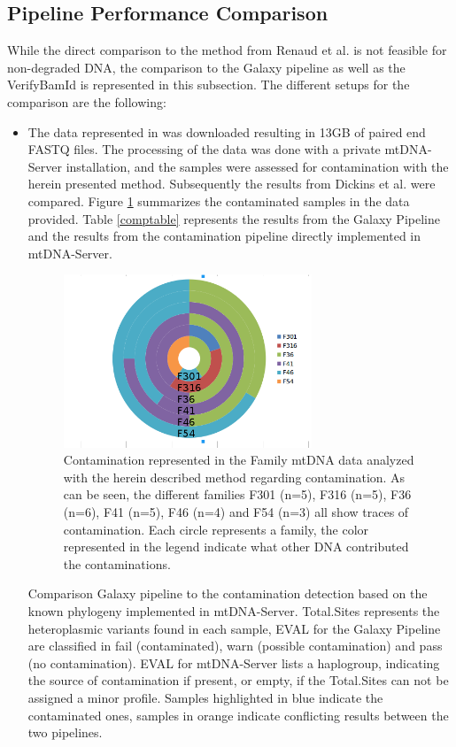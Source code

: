 \subsection{Pipeline Performance Comparison}
While the direct comparison to the method from Renaud et al. \cite{Renaud2015} is not feasible for non-degraded DNA, the comparison to the Galaxy pipeline \cite{Dickins2014} as well as the VerifyBamId \cite{Flickinger2015} is represented in this subsection. The different setups for the comparison are the following: 
\begin{itemize}
\item The data represented in \cite{Dickins2014} was downloaded resulting in 13GB of paired end FASTQ files. The processing of the data was done with a private mtDNA-Server installation, and the samples were assessed for contamination with the herein presented method. Subsequently the results from Dickins et al. were compared. Figure \ref{cont:family} summarizes the contaminated samples in the data provided. Table \ref{comptable} represents the results from the Galaxy Pipeline and the results from the contamination pipeline directly implemented in mtDNA-Server.
\begin{figure}[!ht]
    \centering
    \includegraphics[width=0.7\textwidth]{images/families.png}
    \caption[Contamination represented in the Family mtDNA data]{Contamination represented in the Family mtDNA data  \cite{Dickins2014} analyzed with the herein described method regarding contamination. As can be seen, the different families F301 (n=5), F316 (n=5), F36 (n=6), F41 (n=5), F46 (n=4) and F54 (n=3) all show traces of contamination. Each circle represents a family, the color represented in the legend indicate what other DNA contributed the contaminations.} 
    \label{cont:family}
\end{figure}
\begin{table}[]
\centering
\caption{Comparison Galaxy pipeline to the contamination detection based on the known phylogeny implemented in mtDNA-Server. Total.Sites represents the heteroplasmic variants found in each sample, EVAL for the Galaxy Pipeline are classified in fail (contaminated), warn (possible contamination) and pass (no contamination). EVAL for mtDNA-Server lists a haplogroup, indicating the source of contamination if present, or empty, if the Total.Sites can not be assigned a minor profile. Samples highlighted in blue indicate the contaminated ones, samples in orange indicate conflicting results between the two pipelines.}

\end{table}
\end{itemize}
